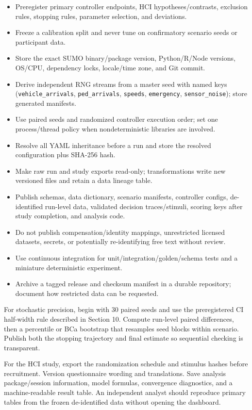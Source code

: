 \documentclass[
  english,
  11pt,
  a4paper,
]{article}
\providecommand{\tightlist}{%
  \setlength{\itemsep}{0pt}\setlength{\parskip}{0pt}}
\begin{document}
\begin{itemize}
\tightlist
\item
  Preregister primary controller endpoints, HCI hypotheses/contrasts,
  exclusion rules, stopping rules, parameter selection, and deviations.
\item
  Freeze a calibration split and never tune on confirmatory scenario
  seeds or participant data.
\item
  Store the exact SUMO binary/package version, Python/R/Node versions,
  OS/CPU, dependency locks, locale/time zone, and Git commit.
\item
  Derive independent RNG streams from a master seed with named keys
  (\texttt{vehicle\_arrivals}, \texttt{ped\_arrivals}, \texttt{speeds},
  \texttt{emergency}, \texttt{sensor\_noise}); store generated
  manifests.
\item
  Use paired seeds and randomized controller execution order; set one
  process/thread policy when nondeterministic libraries are involved.
\item
  Resolve all YAML inheritance before a run and store the resolved
  configuration plus SHA-256 hash.
\item
  Make raw run and study exports read-only; transformations write new
  versioned files and retain a data lineage table.
\item
  Publish schemas, data dictionary, scenario manifests, controller
  configs, de-identified run-level data, validated decision
  traces/stimuli, scoring keys after study completion, and analysis
  code.
\item
  Do not publish compensation/identity mappings, unrestricted licensed
  datasets, secrets, or potentially re-identifying free text without
  review.
\item
  Use continuous integration for unit/integration/golden/schema tests
  and a miniature deterministic experiment.
\item
  Archive a tagged release and checksum manifest in a durable
  repository; document how restricted data can be requested.
\end{itemize}

For stochastic precision, begin with 30 paired seeds and use the
preregistered CI half-width rule described in Section 10. Compute
run-level paired differences, then a percentile or BCa bootstrap that
resamples seed blocks within scenario. Publish both the stopping
trajectory and final estimate so sequential checking is transparent.

For the HCI study, export the randomization schedule and stimulus hashes
before recruitment. Version questionnaire wording and translations. Save
analysis package/session information, model formulas, convergence
diagnostics, and a machine-readable result table. An independent analyst
should reproduce primary tables from the frozen de-identified data
without opening the dashboard.
\end{document}
